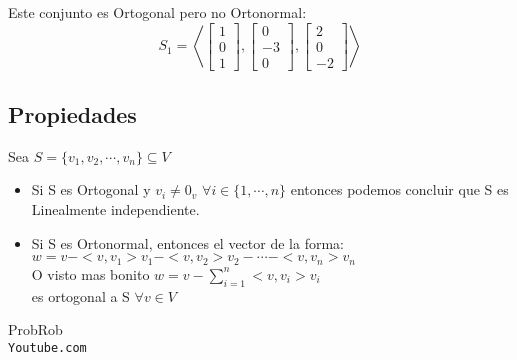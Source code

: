 \documentclass[12pt]{report}							    %
\begin{document}
        Este conjunto es Ortogonal pero no Ortonormal:
        \begin{equation*}
            S_1 = \left< \begin{bmatrix} 1\\0\\1\end{bmatrix} , \begin{bmatrix} 0\\-3\\0\end{bmatrix}, \begin{bmatrix} 2\\0\\-2\end{bmatrix} \right> 
        \end{equation*}


        \subsection{Propiedades}
        Sea $S = \{ v_1 , v_2 , \cdots, v_n \} \subseteq V$

        \begin{itemize}
            \item Si S es Ortogonal y $v_i \neq 0_v$ $\forall i \in \{1, \cdots, n\}$
            entonces podemos concluir que S es Linealmente independiente.

            \item Si S es Ortonormal, entonces el vector de la forma:\\
            $ w = v - <v, v_1> v_1 - <v, v_2> v_2 - \cdots - <v, v_n> v_n $\\
            O visto mas bonito $w = v - \sum_{i = 1}^{n} <v, v_i>v_i$\\
            es ortogonal a S $\forall v \in V$
        \end{itemize}



\clearpage

	\begin{thebibliography}{9}

		ProbRob
		\\\texttt{Youtube.com}


	 

\end{thebibliography}
\end{document}
